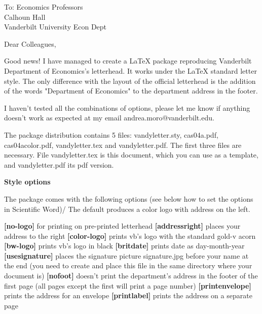 \documentclass{letter}
\begin{document}
\begin{letter}{
To: Economics Professors\\
Calhoun Hall \\
Vanderbilt University Econ Dept}

\opening{
Dear Colleagues,
}


Good news! I have managed to create a LaTeX package reproducing Vanderbilt
Department of Economics's letterhead. It works under the LaTeX standard
letter style. The only difference with the layout of the official letterhead
is the addition of the words "Department of Economics" to the department
address in the footer.

I haven't tested all the combinations of options, please let me know if anything doesn't
work as expected at my email andrea.moro@vanderbilt.edu. 

The package distribution contains 5
files: vandyletter.sty, cas04a.pdf, cas04acolor.pdf, vandyletter.tex and
vandyletter.pdf. The first three files are necessary. File vandyletter.tex
is this document, which you can use as a template, and vandyletter.pdf its
pdf version. \bigskip

\textbf{Style options}

The package comes with the following options (see below how to set the
options in Scientific Word)/ The default produces a color logo with address on the left.

\textbf{[no-logo]} for printing on pre-printed letterhead\vspace{.8ex} \newline 
\textbf{[addressright]} places your address to the right\vspace{.8ex} \newline 
\textbf{[color-logo]} prints vb's logo with the standard gold-v acorn \vspace{.8ex} \newline 
\textbf{[bw-logo]} prints vb's logo in black\vspace{.8ex} \newline 
\textbf{[britdate]} prints date as day-month-year\vspace{.8ex} \newline 
\textbf{[usesignature]} places the signature picture signature.jpg before your name
at the end (you need to create and place this file in the same directory
where your document is)\vspace{.8ex} \newline 
\textbf{[nofoot]} doesn't print the department's address in the footer of the first
page (all pages except the first will print a page number) \vspace{.8ex} \newline 
\textbf{[printenvelope]}
prints the address for an envelope \vspace{.8ex} \newline 
\textbf{[printlabel]} prints the address on a separate page \vspace{.8ex} \newline 



\end{letter}
\end{document}
